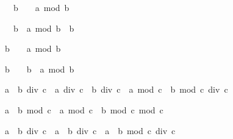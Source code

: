 \begin{isabellebody}
\begin{isamarkuptext}
\begin{isabelle}%
{}\ {}\ b\ {}\ {}\ {}\ a\ mod\ b%
\end{isabelle}

\begin{isabelle}%
{}\ {}\ b\ {}\ a\ mod\ b\ {}\ b%
\end{isabelle}

\begin{isabelle}%
b\ {}\ {}\ {}\ a\ mod\ b\ {}\ {}%
\end{isabelle}

\begin{isabelle}%
b\ {}\ {}\ {}\ b\ {}\ a\ mod\ b%
\end{isabelle}

\begin{isabelle}%
{}a\ {}\ b{}\ div\ c\ {}\ a\ div\ c\ {}\ b\ div\ c\ {}\ {}a\ mod\ c\ {}\ b\ mod\ c{}\ div\ c%
\end{isabelle}

\begin{isabelle}%
{}a\ {}\ b{}\ mod\ c\ {}\ {}a\ mod\ c\ {}\ b\ mod\ c{}\ mod\ c%
\end{isabelle}

\begin{isabelle}%
a\ {}\ b\ div\ c\ {}\ a\ {}\ {}b\ div\ c{}\ {}\ a\ {}\ {}b\ mod\ c{}\ div\ c%
\end{isabelle}


\end{isamarkuptext}
\end{isabellebody}
